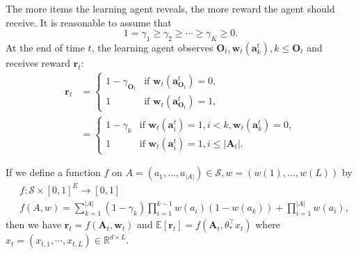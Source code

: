 \documentclass{article}
\newcommand{\EE}{\mathbb{E}}
\newcommand{\RR}{\mathbb{R}}
\newcommand{\bA}{\mathbf{A}}
\newcommand{\ba}{\mathbf{a}}
\newcommand{\bO}{\mathbf{O}}
\newcommand{\br}{\mathbf{r}}
\newcommand{\bw}{\mathbf{w}}
\newcommand{\cS}{\mathcal{S}}
\newcommand{\abs}[1]{\left| #1 \right|}
\begin{document}
The more items the learning agent reveals, the more reward the agent should receive. It is reasonable to assume that
$$
1 = \gamma_1 \geq \gamma_2 \geq \cdots \geq \gamma_K \geq 0.
$$
At the end of time $t$, the learning agent observes $\bO_{t}, \bw_t(\ba_k^t), k \leq \bO_{t}$ and receives reward $\br_{t}$:
\begin{align*}
	\br_{t} &= \begin{cases}
		1 - \gamma_{\bO_{t}}  &\text{if } \bw_t(\ba_{\bO_{t}}^t) = 0,\\
		1 &\text{if } \bw_t(\ba_{\bO_{t}}^t) = 1,
	\end{cases}\\
	&=\begin{cases}
		1-\gamma_{k}  &\text{if } \bw_t(\ba_{i}^t) = 1, i < k, \bw_t(\ba_{k}^t) = 0,\\
		1 &\text{if } \bw_t(\ba_{i}^t) = 1, i\leq \abs{\bA_t}.
	\end{cases}
\end{align*}

If we define a function $f$ on $A = (a_1, \ldots, a_{\abs{A}}) \in \cS, w = (w(1), \ldots, w(L))$ by
\begin{align}
	&f: \cS \times [0,1]^E \to [0,1] \nonumber \\
	&f(A,w) = \sum_{k = 1}^{\abs{A}} (1 - \gamma_k) \prod_{i = 1}^{k - 1} w(a_i)(1 - w(a_k)) + \prod_{i=1}^{\abs{A}}w(a_i),
\label{eq:AndRewardFunc}
\end{align}
then we have $\br_{t} = f(\bA_t, \bw_t)$ and $\EE[\br_{t}] = f(\bA_t, \theta_{\ast}^{\top}x_t)$ where $x_t = (x_{t,1}, \cdots, x_{t,L}) \in \RR^{d \times L}$. 
\end{document}
